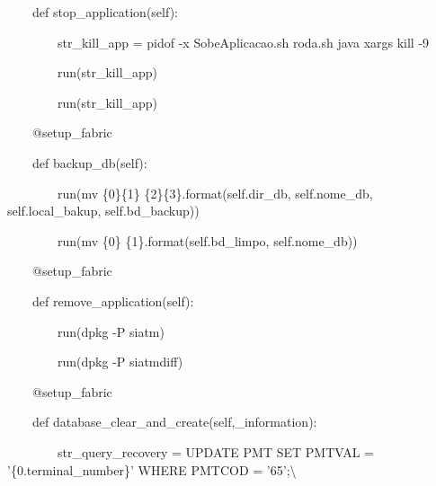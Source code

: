 {\ttfamily\color[rgb]{0.10980392,0.10980392,0.10980392}
    \ \ \ \ def stop\_application(self):}

{\ttfamily\color[rgb]{0.10980392,0.10980392,0.10980392}
    \ \ \ \ \ \ \ \ str\_kill\_app = {\textquotedbl}pidof -x SobeAplicacao.sh roda.sh java {\textbar} xargs kill
        -9{\textquotedbl}}

{\ttfamily\color[rgb]{0.10980392,0.10980392,0.10980392}
    \ \ \ \ \ \ \ \ run(str\_kill\_app)}

{\ttfamily\color[rgb]{0.10980392,0.10980392,0.10980392}
    \ \ \ \ \ \ \ \ run(str\_kill\_app)}


    \bigskip

{\ttfamily\color[rgb]{0.10980392,0.10980392,0.10980392}
    \ \ \ \ @setup\_fabric}

{\ttfamily\color[rgb]{0.10980392,0.10980392,0.10980392}
    \ \ \ \ def backup\_db(self):}

{\ttfamily\color[rgb]{0.10980392,0.10980392,0.10980392}
    \ \ \ \ \ \ \ \ run({\textquotedbl}mv \{0\}\{1\} \{2\}\{3\}{\textquotedbl}.format(self.dir\_db, self.nome\_db,
                self.local\_bakup, self.bd\_backup))}

{\ttfamily\color[rgb]{0.10980392,0.10980392,0.10980392}
    \ \ \ \ \ \ \ \ run({\textquotedbl}mv \{0\} \{1\}{\textquotedbl}.format(self.bd\_limpo, self.nome\_db))}


    \bigskip

{\ttfamily\color[rgb]{0.10980392,0.10980392,0.10980392}
    \ \ \ \ @setup\_fabric}

{\ttfamily\color[rgb]{0.10980392,0.10980392,0.10980392}
    \ \ \ \ def remove\_application(self):}

{\ttfamily\color[rgb]{0.10980392,0.10980392,0.10980392}
    \ \ \ \ \ \ \ \ run({\textquotedbl}dpkg -P siatm{\textquotedbl})}

{\ttfamily\color[rgb]{0.10980392,0.10980392,0.10980392}
    \ \ \ \ \ \ \ \ run({\textquotedbl}dpkg -P siatmdiff{\textquotedbl})}


    \bigskip

{\ttfamily\color[rgb]{0.10980392,0.10980392,0.10980392}
    \ \ \ \ @setup\_fabric}

{\ttfamily\color[rgb]{0.10980392,0.10980392,0.10980392}
    \ \ \ \ def database\_clear\_and\_create(self,\_information):}

{\ttfamily\color[rgb]{0.10980392,0.10980392,0.10980392}
    \ \ \ \ \ \ \ \ str\_query\_recovery = {\textquotedbl}{\textquotedbl}{\textquotedbl}UPDATE PMT SET PMTVAL =
        '\{0.terminal\_number\}' WHERE PMTCOD = '65';{\textbackslash}}

